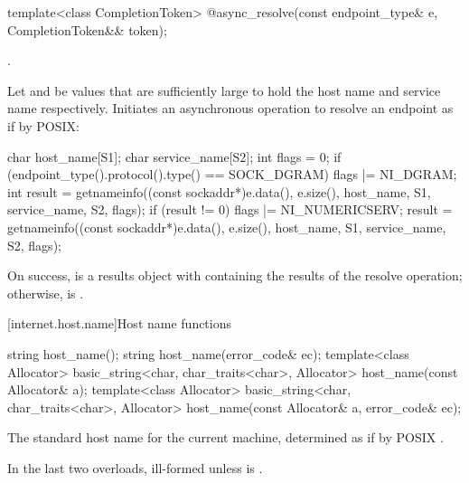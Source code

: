 \begin{itemdecl}
template<class CompletionToken>
  @\DEDUCED@ async_resolve(const endpoint_type& e,
                        CompletionToken&& token);
\end{itemdecl}

\begin{itemdescr}
\pnum
\completionsig {}.

\pnum
\effects Let  and  be  values that are sufficiently large to hold the host name and service name respectively. Initiates an asynchronous operation to resolve an endpoint as if by POSIX:
\begin{codeblock}
char host_name[S1];
char service_name[S2];
int flags = 0;
if (endpoint_type().protocol().type() == SOCK_DGRAM)
  flags |= NI_DGRAM;
int result = getnameinfo((const sockaddr*)e.data(), e.size(),
                         host_name, S1,
                         service_name, S2,
                         flags);
if (result != 0)
{
  flags |= NI_NUMERICSERV;
  result = getnameinfo((const sockaddr*)e.data(), e.size(),
                       host_name, S1,
                       service_name, S2,
                       flags);
}
\end{codeblock}
 On success,  is a results object with  containing the results of the resolve operation; otherwise,  is .
\end{itemdescr}




[internet.host.name]{Host name functions}

%
\begin{itemdecl}
string host_name();
string host_name(error_code& ec);
template<class Allocator>
  basic_string<char, char_traits<char>, Allocator>
    host_name(const Allocator& a);
template<class Allocator>
  basic_string<char, char_traits<char>, Allocator>
    host_name(const Allocator& a, error_code& ec);
\end{itemdecl}

\begin{itemdescr}
\pnum
\returns The standard host name for the current machine, determined as if by POSIX .

\pnum
\remarks In the last two overloads, ill-formed unless  is .
\end{itemdescr}



